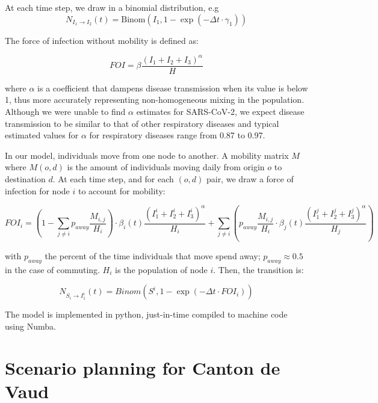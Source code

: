 At each time step, we draw in a binomial distribution, e.g 
\begin{equation}
N_{I_1\longrightarrow I_2}(t) = \text{Binom}(I_1, 1 - \exp(-\Delta t \cdot \gamma_1))
\end{equation}


The force of infection without mobility is defined as: 

\begin{equation}
FOI = \beta \frac{(I_1 + I_2 + I_3)^\alpha}{H} 
\end{equation}

where $\alpha$ is a coefficient that dampens disease transmission when its value is below 1, thus more accurately representing non-homogeneous mixing in the population. Although we were unable to find $\alpha$ estimates for SARS-CoV-2, we expect disease transmission to be similar to that of other respiratory diseases and typical estimated values for $\alpha$ for respiratory diseases range from 0.87 to 0.97.

In our model, individuals move from one node to another. A mobility matrix $M$ where
$M(o,d)$ is the amount of individuals moving daily from origin $o$ to
destination $d$. At each time step, and for each $(o,d)$ pair, we draw a force of infection 
for node $i$ to account for mobility:

\begin{equation}
FOI_i = \left(1 - \sum_{j\neq i} p_{away} \frac{M_{i,j}}{H_i} \right) \cdot \beta_i(t) \frac{(I_1^{i} + I_2^{i} + I_3^{i})^\alpha}{H_i} +  \sum_{j \neq i} \left(p_{away} \frac{M_{i,j}}{H_i} \cdot \beta_j(t) \frac{(I_1^j + I_2^j + I_3^j)^\alpha}{H_j} \right)
\end{equation}

with $p_{away}$ the percent of the time individuals that move spend away; $p_{away} \approx 0.5$ in the case of commuting. $H_i$ is the population of node $i$. Then, the transition is:

\begin{equation}
N_{S_i \longrightarrow I_1^{i}}(t) = Binom(S^i, 1 - \exp(-\Delta t \cdot FOI_i))
\end{equation}

The model is implemented in python, just-in-time compiled to machine code using Numba.





\section{Scenario planning for Canton de Vaud}





